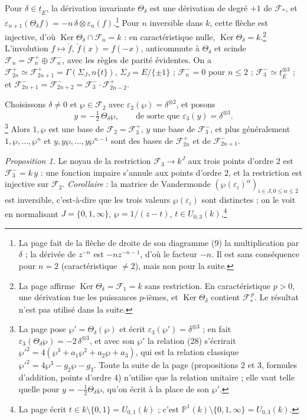 \documentclass[11pt,a4paper]{article}
\begin{document}
Pour $\delta \in \underline{t}_E$, la dérivation invariante $\Theta_\delta$ est
une dérivation de degré $+1$ de $\mathcal{F}_{*}$, et $\varepsilon_{n+1}(\Theta_\delta
f) = -n\, \delta \otimes \varepsilon_n(f)$.\footnote{La page fait de la flèche
de droite de son diagramme (9) la multiplication par $\delta$ ; la dérivée de
$z^{-n}$ est $-n z^{-n-1}$, d'où le facteur $-n$. Il est sans conséquence pour
$n = 2$ (caractéristique $\neq 2$), mais non pour la suite.} Pour $n$ inversible
dans $k$, cette flèche est injective, d'où $\operatorname{Ker} \Theta_\delta
\cap \mathcal{F}_n = k$ : en caractéristique nulle, $\operatorname{Ker}
\Theta_\delta = k$.\footnote{La page affirme $\operatorname{Ker} \Theta_\delta =
\mathcal{F}_1 = k$ sans restriction. En caractéristique $p > 0$, une dérivation
tue les puissances $p$-ièmes, et $\operatorname{Ker} \Theta_\delta$ contient
$\mathcal{F}_{*}^{\,p}$. Le résultat n'est pas utilisé dans la suite.}
L'involution $f \mapsto \check f$, $\check f(x) = f(-x)$, anticommute à
$\Theta_\delta$ et scinde $\mathcal{F}_n = \mathcal{F}_n^{+} \oplus
\mathcal{F}_n^{-}$, avec les règles de parité évidentes. On a
$\mathcal{F}^{+}_{2n} \simeq \mathcal{F}^{+}_{2n+1} = \Gamma(\Sigma_J, n\{t\})$,
$\Sigma_J = E/\{\pm 1\}$ ; $\mathcal{F}_n^{-} = 0$ pour $n \leq 2$ ;
$\mathcal{F}_3^{-} \simeq \underline{t}_E^{\otimes 3}$ ; et
$\mathcal{F}^{-}_{2n+1} = \mathcal{F}^{-}_{2n+2} = \mathcal{F}_3^{-} \cdot
\mathcal{F}^{+}_{2n-2}$.

Choisissons $\delta \neq 0$ et $\wp \in \mathcal{F}_2$ avec $\varepsilon_2(\wp)
= \delta^{\otimes 2}$, et posons
\[
y = -\tfrac12\, \Theta_\delta \wp, \qquad \text{de sorte que } \varepsilon_3(y)
= \delta^{\otimes 3} .
\]
\footnote{La page pose $\wp' = \Theta_\delta(\wp)$ et écrit
$\varepsilon_3(\wp') = \delta^{\otimes 3}$ ; en fait $\varepsilon_3(\Theta_\delta
\wp) = -2\,\delta^{\otimes 3}$, et avec son $\wp'$ la relation (28) s'écrirait
$\wp'^2 = 4(\wp^3 + a_1 \wp^2 + a_2 \wp + a_3)$, qui est la relation classique
$\wp'^2 = 4\wp^3 - g_2 \wp - g_3$. Toute la suite de la page (propositions 2 et
3, formules d'addition, points d'ordre $4$) n'utilise que la relation unitaire ;
elle vaut telle quelle pour $y = -\frac12 \Theta_\delta \wp$, qu'on écrit à la
place de son $\wp'$.} Alors $1, \wp$ est une base de $\mathcal{F}_2 =
\mathcal{F}_3^{+}$, $y$ une base de $\mathcal{F}_3^{-}$, et plus généralement
$1, \wp, \ldots, \wp^n$ et $y, y\wp, \ldots, y\wp^{n-1}$ sont des bases de
$\mathcal{F}^{+}_{2n}$ et de $\mathcal{F}^{-}_{2n+1}$.

\emph{Proposition 1.} Le noyau de la restriction $\mathcal{F}_3 \to k^J$ aux
trois points d'ordre $2$ est $\mathcal{F}_3^{-} = k\, y$ : une fonction impaire
s'annule aux points d'ordre $2$, et la restriction est injective sur
$\mathcal{F}_2$. \emph{Corollaire} : la matrice de Vandermonde
$(\wp(\varepsilon_i)^\alpha)_{i \in J, 0 \leq \alpha \leq 2}$ est inversible,
c'est-à-dire que les trois valeurs $\wp(\varepsilon_i)$ sont distinctes ; on le
voit en normalisant $J = \{0, 1, \infty\}$, $\wp = 1/(z - t)$, $t \in
U_{0,3}(k)$.\footnote{La page écrit $t \in k \setminus \{0, 1\} = U_{0,1}(k)$ ;
c'est $\mathbb{P}^1(k) \setminus \{0, 1, \infty\} = U_{0,3}(k)$.}
\end{document}
